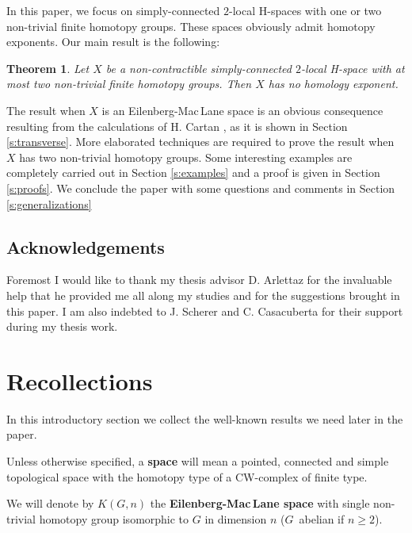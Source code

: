 \documentclass{amsart}
\newtheorem*{thm*}{Theorem}
\theoremstyle{definition}
\theoremstyle{remark}
\renewcommand{\geq}{\geqslant}
\begin{document}
In this paper, we focus on simply-connected $2$-local H-spaces with one or two non-trivial finite homotopy groups. These spaces obviously admit homotopy exponents. Our main result is the following:

\begin{thm*}
Let $X$ be a non-contractible simply-connected $2$-local H-space with at most two non-trivial finite homotopy groups. Then $X$ has no homology exponent.
\end{thm*}

The result when $X$ is an Eilenberg-Mac\,Lane space is an obvious consequence resulting from the calculations of H. Cartan \cite{Ca55}, as it is shown in Section \ref{s:transverse}. More elaborated techniques are required to prove the result when $X$ has two non-trivial homotopy groups. Some interesting examples are completely carried out in Section \ref{s:examples} and a proof is given in Section \ref{s:proofs}. We conclude the paper with some questions and comments in Section \ref{s:generalizations}

\subsection*{Acknowledgements}

Foremost I would like to thank my thesis advisor D. Arlettaz for the invaluable help that he provided me all along my studies and for the suggestions brought in this paper. I am also indebted to J. Scherer and C. Casacuberta for their support during my thesis work.

\section{Recollections}\label{s:recollections}

In this introductory section we collect the well-known results we need later in the paper.

Unless otherwise specified, a {\bf space} will mean a pointed, connected and simple topological space with the homotopy type of a CW-complex of finite type. 

We will denote by $K(G,n)$ the {\bf Eilenberg-Mac\,Lane space} with single non-trivial homotopy group isomorphic to $G$ in dimension $n$ ($G$~abelian if $n\geq2$).
\end{document}
